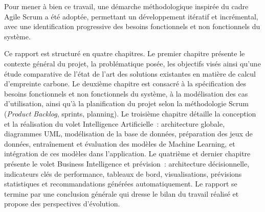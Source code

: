 Pour mener à bien ce travail, une démarche méthodologique inspirée du cadre Agile Scrum a été adoptée, permettant un développement itératif et incrémental, avec une identification progressive des besoins fonctionnels et non fonctionnels du système.

Ce rapport est structuré en quatre chapitres. Le premier chapitre présente le contexte général du projet, la problématique posée, les objectifs visés ainsi qu'une étude comparative de l'état de l'art des solutions existantes en matière de calcul d'empreinte carbone. Le deuxième chapitre est consacré à la spécification des besoins fonctionnels et non fonctionnels du système, à la modélisation des cas d'utilisation, ainsi qu'à la planification du projet selon la méthodologie Scrum (\textit{Product Backlog}, sprints, planning). Le troisième chapitre détaille la conception et la réalisation du volet Intelligence Artificielle~: architecture globale, diagrammes UML, modélisation de la base de données, préparation des jeux de données, entraînement et évaluation des modèles de Machine Learning, et intégration de ces modèles dans l'application. Le quatrième et dernier chapitre présente le volet Business Intelligence et prévision~: architecture décisionnelle, indicateurs clés de performance, tableaux de bord, visualisations, prévisions statistiques et recommandations générées automatiquement. Le rapport se termine par une conclusion générale qui dresse le bilan du travail réalisé et propose des perspectives d'évolution.
